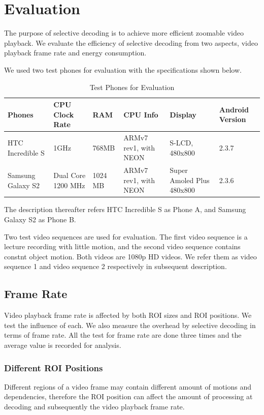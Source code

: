 \section{Evaluation}
The purpose of selective decoding is to achieve more efficient zoomable video playback. We evaluate the efficiency of selective decoding from two aspects, video playback frame rate and energy consumption. 

We used two test phones for evaluation with the specifications shown below.
\begin{table}
\centering
\caption{Test Phones for Evaluation}
\begin{tabular}{|p{2.0cm}|p{2.0cm}|p{1.5cm}|p{2.0cm}|p{2.0cm}|p{1.5cm}|}
\hline
Phones & CPU Clock Rate & RAM & CPU Info & Display & Android Version \\
\hline
HTC Incredible S & 1GHz & 768MB & ARMv7 rev1, with NEON & S-LCD, 480x800 & 2.3.7 \\
\hline
Samsung Galaxy S2 & Dual Core 1200 MHz & 1024 MB & ARMv7 rev1, with NEON & Super Amoled Plus 480x800 & 2.3.6 \\
\hline
\end{tabular}
\end{table}
The description thereafter refers HTC Incredible S as Phone A, and Samsung Galaxy S2 as Phone B.

Two test video sequences are used for evaluation. The first video sequence is a lecture recording with little motion, and the second video sequence contains constnt object motion. Both videos are 1080p HD videos. We refer them as video sequence 1 and video sequence 2 respectively in subsequent description.

\subsection{Frame Rate}
Video playback frame rate is affected by both ROI sizes and ROI positions. We test the influence of each. We also measure the overhead by selective decoding in terms of frame rate. All the test for frame rate are done three times and the average value is recorded for analysis. 

\subsubsection{Different ROI Positions}
Different regions of a video frame may contain different amount of motions and dependencies, therefore the ROI position can affect the amount of processing at decoding and subsequently the video playback frame rate. 


